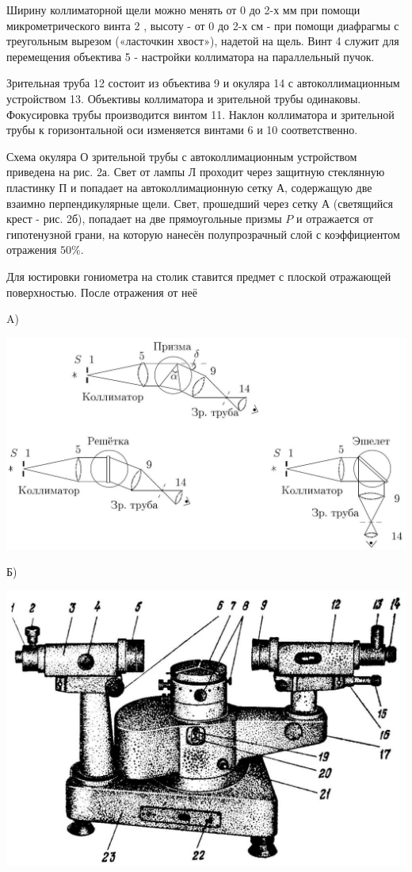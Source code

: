 \documentclass[a4paper,12pt]{article} %
\begin{document}
Ширину коллиматорной щели можно менять от 0 до 2-х мм при помощи микрометрического винта 2 , высоту - от 0 до 2-х см - при помощи диафрагмы с треугольным вырезом («ласточкин хвост»), надетой на щель. Винт 4 служит для перемещения объектива 5 - настройки коллиматора на параллельный пучок.

Зрительная труба 12 состоит из объектива 9 и окуляра 14 с автоколлимационным устройством 13. Объективы коллиматора и зрительной трубы одинаковы. Фокусировка трубы производится винтом 11. Наклон коллиматора и зрительной трубы к горизонтальной оси изменяется винтами 6 и 10 соответственно.

Схема окуляра О зрительной трубы с автоколлимационным устройством приведена на рис. 2а. Свет от лампы Л проходит через защитную стеклянную пластинку П и попадает на автоколлимационную сетку А, содержащую две взаимно перпендикулярные щели. Свет, прошедший через сетку А (светящийся крест - рис. 2б), попадает на две прямоугольные призмы $P$ и отражается от гипотенузной грани, на которую нанесён полупрозрачный слой с коэффициентом отражения $50 \%$.

Для юстировки гониометра на столик ставится предмет с плоской отражающей поверхностью. После отражения от неё 

A)
\begin{center}
    \includegraphics[scale=0.2]{2023_04_02_a48ae02e429ba186bcd7g-2}
\end{center}


Б)

\begin{center}
\includegraphics[scale=0.2]{2023_04_02_a48ae02e429ba186bcd7g-2(2)}
\end{center}
\end{document}
